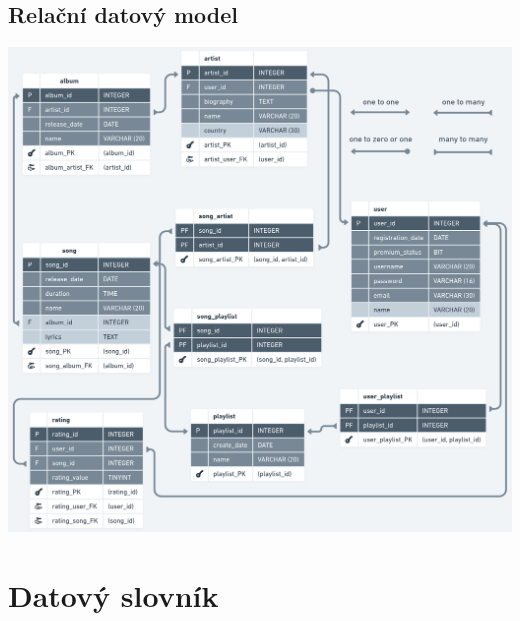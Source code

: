 \documentclass[czech,12pt,a4paper,titlepage]{article}
\begin{document}
    \subsection*{Relační datový model}
    \bigskip
    \bigskip
    \includegraphics[width=1\textwidth, center]{relacni_datovy_model}

    \clearpage

    \section*{Datový slovník}
    
\end{document}
